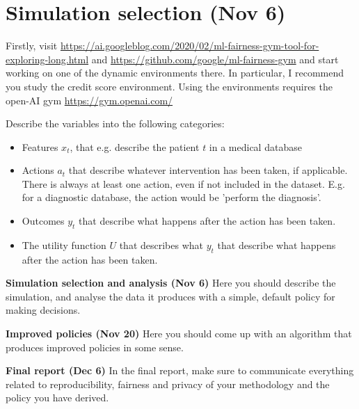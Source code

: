 
\section{Simulation selection (Nov 6)}

Firstly, visit \url{https://ai.googleblog.com/2020/02/ml-fairness-gym-tool-for-exploring-long.html} and  \url{https://github.com/google/ml-fairness-gym} and start working on one of the dynamic environments there. In particular, I recommend you study the credit score environment. Using the environments requires the open-AI gym \url{https://gym.openai.com/}

Describe the variables into the following categories:
\begin{itemize}
\item Features $x_t$, that e.g. describe the patient $t$ in a medical database
\item Actions $a_t$ that describe whatever intervention has been taken, if applicable. There is always at least one action, even if not included in the dataset. E.g. for a diagnostic database, the action would be 'perform the diagnosis'.
\item Outcomes $y_t$ that describe what happens after the action has been taken.
\item The utility function $U$ that describes what  $y_t$ that describe what happens after the action has been taken.
\end{itemize}


\textbf{Simulation selection and analysis (Nov 6)} Here you should describe the simulation, and analyse the data it produces with a simple, default policy for making decisions.

\textbf{Improved policies (Nov 20)} Here you should come up with an algorithm that produces improved policies in some sense.

\textbf{Final report (Dec 6)} In the final report, make sure to communicate everything related to reproducibility, fairness and privacy of your methodology and the policy you have derived.







